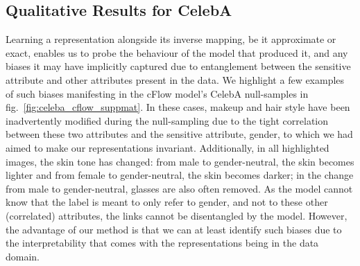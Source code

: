 \subsection{Qualitative Results for CelebA}\label{sec:qual-results-celeba}
\noindent Learning a representation alongside its inverse mapping, be it approximate or exact, enables us to probe the behaviour of the model that produced it,
and any biases it may have implicitly captured due to entanglement between the sensitive attribute and other attributes present in the data.
We highlight a few examples of such biases manifesting in the cFlow model's CelebA null-samples in fig.~\ref{fig:celeba_cflow_suppmat}. In these cases, makeup and hair style have been inadvertently modified during the null-sampling due to the tight correlation between these two attributes and the sensitive attribute, gender, to which we had aimed to make our representations invariant. Additionally, in all highlighted images, the skin tone has changed: from male to gender-neutral, the skin becomes lighter and from female to gender-neutral, the skin becomes darker; in the change from male to gender-neutral, glasses are also often removed.
As the model cannot know that the label is meant to only refer to gender, and not to these other (correlated) attributes,
the links cannot be disentangled by the model.
However, the advantage of our method is that we can at least identify such biases due to the interpretability that comes with the representations being in the data domain.

